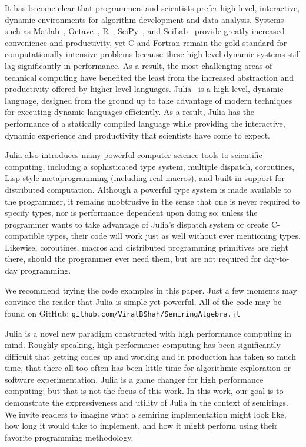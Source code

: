 \documentclass[conference]{IEEEtran}
\begin{document}
It has become clear that programmers and scientists prefer high-level, interactive, dynamic environments for algorithm development and data analysis.
Systems such as Matlab~\cite{matlab}, Octave~\cite{Octave}, R~\cite{Rlang}, SciPy~\cite{numpy}, and SciLab~\cite{scilab} provide greatly increased convenience and productivity, yet C and Fortran remain the gold standard for computationally-intensive problems because these high-level dynamic systems still lag significantly in performance.
As a result, the most challenging areas of technical computing have benefited the least from the increased abstraction and productivity offered by higher level languages.
Julia~\cite{julia} is a high-level, dynamic language, designed from the ground up to take advantage of modern techniques for executing dynamic languages efficiently.
As a result, Julia has the performance of a statically compiled language while providing the interactive, dynamic experience and productivity that scientists have come to expect.

Julia also introduces many powerful computer science tools to scientific computing, including a sophisticated type system, multiple dispatch, coroutines, Lisp-style metaprogramming (including real macros), and built-in support for distributed computation.
Although a powerful type system is made available to the programmer, it remains unobtrusive in the sense that one is never required to specify types, nor is performance dependent upon doing so:
unless the programmer wants to take advantage of Julia's dispatch system or create C-compatible types, their code will work just as well without ever mentioning types.
Likewise, coroutines, macros and distributed programming primitives are right there, should the programmer ever need them, but are not required for day-to-day programming.

We recommend trying the code examples in this paper.
Just a few moments may convince the reader that Julia is simple yet powerful.
All of the code may be found on GitHub:
{\tt github.com/ViralBShah/SemiringAlgebra.jl}


Julia is a novel new paradigm constructed with high performance computing in mind.  Roughly speaking, high performance computing has been significantly difficult that getting codes up and working and in production has taken so much time, that there all too often has been little time for algorithmic exploration or software experimentation.  Julia is a game changer for high performance computing; but that is not the focus of this work.  In this work, our goal is to demonstrate the expressiveness and utility of Julia in the context of semirings.  We invite readers to imagine what a semiring implementation might look like, how long it would take to implement, and  how it might perform using their favorite programming methodology.
 
\end{document}
